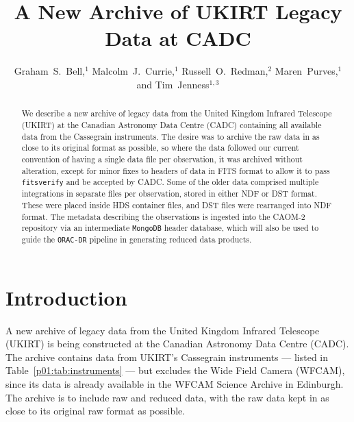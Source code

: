 \documentclass[11pt,twoside]{article}
\begin{document}
\title{A New Archive of UKIRT Legacy Data at CADC}
\author{Graham~S.~Bell,$^1$ Malcolm~J.~Currie,$^1$ Russell~O.~Redman,$^2$ Maren~Purves,$^1$ and Tim~Jenness$^{1,3}$
}

\begin{abstract}
We describe a  new archive of legacy data from the United Kingdom Infrared
Telescope (UKIRT) at the Canadian Astronomy
Data Centre (CADC) containing all available data
from the Cassegrain instruments.
The desire was to archive the raw data in as close to its original
format as possible, so where the data followed our current convention
of having a single data file per observation, it was archived
without alteration, except for minor fixes to headers of data in
FITS format to allow it to pass \texttt{fitsverify} and be accepted by CADC.
Some of the older data comprised multiple integrations in separate
files per observation, stored in either NDF or DST format. These
were placed inside HDS container files, and DST files were rearranged
into NDF format.
The metadata describing the observations is
ingested into the CAOM-2 repository via an
intermediate \texttt{MongoDB} header database, which will
also be used to guide the \texttt{ORAC-DR} pipeline
in generating reduced data products.
\end{abstract}

\section{Introduction}

A new archive of legacy data from the United Kingdom Infrared
Telescope (UKIRT) is being constructed at the Canadian Astronomy
Data Centre (CADC).
The archive contains data from UKIRT's Cassegrain instruments
--- listed in Table~\ref{p01:tab:instruments} ---
but excludes the Wide Field Camera (WFCAM),
since its data is already available in the WFCAM Science Archive
\citep{2008MNRAS.384..637H}
in Edinburgh.
The archive is to include raw and reduced data,
with the raw data
kept in as close to its original raw format as possible.
\end{document}
